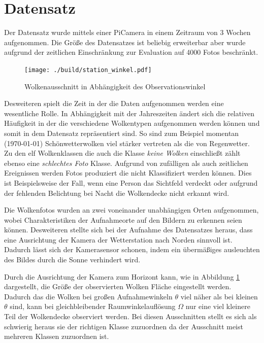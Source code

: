 \section{Datensatz}
\label{sec:02_Datensatz}

Der Datensatz wurde mittels einer PiCamera in einem Zeitraum von 3 Wochen
aufgenommen. 
Die Größe des Datensatzes ist beliebig erweiterbar aber wurde aufgrund der
zeitlichen Einschränkung zur Evaluation auf \num{4000} Fotos beschränkt. 

\begin{figure}
		\centering
		\vspace{-0.5cm}
		\texttt{[image: ./build/station\_winkel.pdf]}
		\caption{Wolkenausschnitt in Abhängigkeit des Observationswinkel}
		\label{fig:theta}
		\vspace{-0.5cm}
\end{figure}
Desweiteren spielt die Zeit in der die Daten aufgenommen werden eine 
wesentliche Rolle.
In Abhängigkeit mit der Jahreszeiten ändert sich die relativen Häufigkeit in 
der die verschiedene Wolkentypen aufgenommen werden können und somit in dem 
Datensatz repräsentiert sind. 
So sind zum Beispiel momentan (\today) Schönwetterwolken viel stärker vertreten
als die von Regenwetter. 
Zu den elf Wolkenklassen die auch die Klasse \textit{keine Wolken} einschließt 
zählt ebenso eine \textit{schlechtes Foto} Klasse. 
Aufgrund von zufälligen als auch zeitlichen Ereignissen werden Fotos produziert
die nicht Klassifiziert werden können.
Dies ist Beispielsweise der Fall, wenn eine Person das Sichtfeld verdeckt oder 
aufgrund der fehlenden Belichtung bei Nacht die Wolkendecke nicht erkannt wird.

Die Wolkenfotos wurden an zwei voneinander unabhängigen Orten aufgenommen, wobei
Charakteristiken der Aufnahmeorte auf den Bildern zu erkennen seien können.
Desweiteren stellte sich bei der Aufnahme des Datensatzes heraus, dass eine
Ausrichtung der Kamera der Wetterstation nach Norden sinnvoll ist.
Dadurch lässt sich der Kamerasensor schonen, indem ein übermäßiges ausleuchten
 des Bildes durch die Sonne verhindert wird.

Durch die Ausrichtung der Kamera zum Horizont kann, wie in Abbildung
 \ref{fig:theta} dargestellt, die Größe der observierten Wolken Fläche 
eingestellt werden.
Dadurch das die Wolken bei großen Aufnahmewinkeln $\theta$ viel näher als bei
kleinen $\theta$ sind, kann bei gleichbleibender Raumwinkelauflösung $\Omega$
nur eine viel kleinere Teil der Wolkendecke observiert werden.
Bei diesen Ausschnitten stellt es sich als schwierig heraus sie der richtigen
Klasse zuzuordnen da der Ausschnitt meist mehreren Klassen zuzuordnen ist. 

